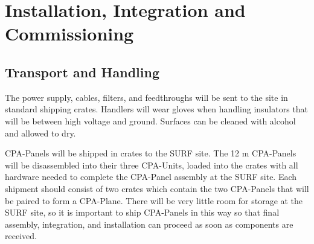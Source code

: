 %
%
%
%
%
%
%
%
%
%
\section{Installation, Integration and Commissioning}
\label{sec:fdsp-hv-install}

\subsection{Transport and Handling}
\label{sec:fdsp-hv-install-transport}

The power supply, cables, filters, and feedthroughs will be sent to the site in standard shipping crates.  Handlers will wear gloves when handling insulators that will be between high voltage and ground.  Surfaces can be cleaned with alcohol and allowed to dry.

CPA-Panels will be shipped in crates to the SURF site.  The 12 m CPA-Panels will be disassembled into their three CPA-Units, loaded into the crates with all hardware needed to complete the CPA-Panel assembly at the SURF site.  Each shipment should consist of two crates which contain the two CPA-Panels that will be paired to form a CPA-Plane. There will be very little room for storage at the SURF site, so it is important to ship CPA-Panels in this way so that final assembly, integration, and installation can proceed as soon as components are received.

